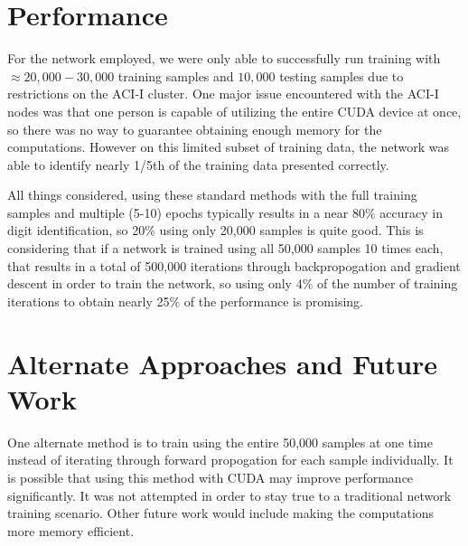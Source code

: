 \documentclass[11pt]{article}
\begin{document}
\section{Performance}
For the network employed, we were only able to successfully run training with $\approx 20,000-30,000$ training samples and $10,000$ testing samples due to restrictions on the ACI-I cluster. One major issue encountered with the ACI-I nodes was that one person is capable of utilizing the entire CUDA device at once, so there was no way to guarantee obtaining enough memory for the computations. However on this limited subset of training data, the network was able to identify nearly 1/5th of the training data presented correctly.

All things considered, using these standard methods with the full training samples and multiple (5-10) epochs typically results in a near 80\% accuracy in digit identification, so 20\% using only 20,000 samples is quite good. This is considering that if a network is trained using all 50,000 samples 10 times each, that results in a total of 500,000 iterations through backpropogation and gradient descent in order to train the network, so using only 4\% of the number of training iterations to obtain nearly 25\% of the performance is promising.

\section{Alternate Approaches and Future Work}
One alternate method is to train using the entire 50,000 samples at one time instead of iterating through forward propogation for each sample individually. It is possible that using this method with CUDA may improve performance significantly. It was not attempted in order to stay true to a traditional network training scenario. Other future work would include making the computations more memory efficient.
\end{document}
